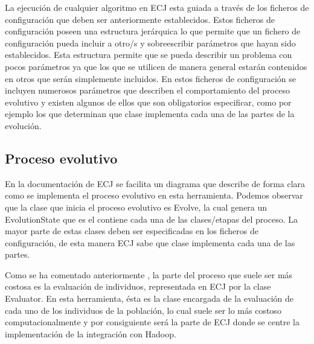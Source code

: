 
La ejecución de cualquier algoritmo en ECJ esta guiada a través de los ficheros de configuración que deben ser anteriormente establecidos. Estos ficheros de configuración poseen una estructura jerárquica lo que permite que un fichero de configuración pueda incluir a otro/s y sobreescribir parámetros que hayan sido establecidos. Esta estructura permite que se pueda describir un problema con pocos parámetros ya que los que se utilicen de manera general estarán contenidos en otros que ser\'an simplemente incluidos. En estos ficheros de configuración se incluyen numerosos parámetros que describen el comportamiento del proceso evolutivo y existen algunos de ellos que son obligatorios especificar, como por ejemplo los que determinan que clase implementa cada una de las partes de la evolución.

\subsection{Proceso evolutivo}

En la documentación de ECJ se facilita un diagrama  que describe de forma clara como se implementa el proceso evolutivo en esta herramienta. Podemos observar que la clase que inicia el proceso evolutivo es Evolve, la cual genera un EvolutionState que es el contiene cada una de las clases/etapas del proceso. La mayor parte de estas clases deben ser especificadas en los ficheros de configuración, de esta manera ECJ sabe que clase implementa cada una de las partes.

Como se ha comentado anteriormente , la parte del proceso que suele ser m\'as costosa es la evaluación de individuos, representada  en ECJ por la clase Evaluator. En esta herramienta, \'esta es la clase encargada de la evaluación de cada uno de los individuos de la población, lo cual suele ser lo m\'as costoso computacionalmente y por consiguiente ser\'a la parte de ECJ donde se centre la implementación de la integración con Hadoop.